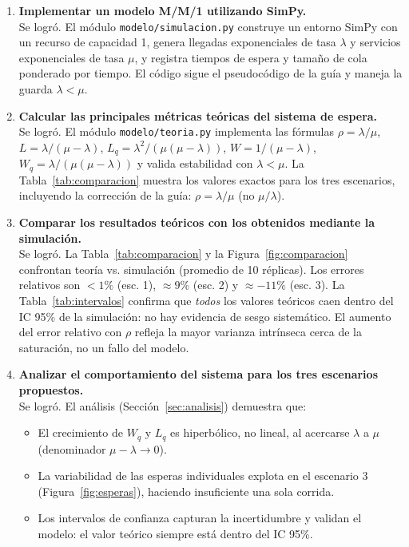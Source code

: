 \documentclass[11pt,a4paper]{article}
\begin{document}
\begin{enumerate}
    \item \textbf{Implementar un modelo M/M/1 utilizando SimPy.}
    \\
    Se logró. El módulo \texttt{modelo/simulacion.py} construye un entorno
    SimPy con un recurso de capacidad 1, genera llegadas exponenciales de tasa
    $\lambda$ y servicios exponenciales de tasa $\mu$, y registra tiempos de
    espera y tamaño de cola ponderado por tiempo. El código sigue el
    pseudocódigo de la guía y maneja la guarda $\lambda < \mu$.

    \item \textbf{Calcular las principales métricas teóricas del sistema de espera.}
    \\
    Se logró. El módulo \texttt{modelo/teoria.py} implementa las fórmulas
    $\rho=\lambda/\mu$, $L=\lambda/(\mu-\lambda)$, $L_q=\lambda^2/(\mu(\mu-\lambda))$,
    $W=1/(\mu-\lambda)$, $W_q=\lambda/(\mu(\mu-\lambda))$ y valida estabilidad con
    $\lambda < \mu$. La Tabla~\ref{tab:comparacion} muestra los valores exactos para
    los tres escenarios, incluyendo la corrección de la guía: $\rho=\lambda/\mu$
    (no $\mu/\lambda$).

    \item \textbf{Comparar los resultados teóricos con los obtenidos mediante la simulación.}
    \\
    Se logró. La Tabla~\ref{tab:comparacion} y la Figura~\ref{fig:comparacion}
    confrontan teoría vs. simulación (promedio de 10 réplicas). Los errores
    relativos son $< 1\%$ (esc. 1), $\approx 9\%$ (esc. 2) y $\approx -11\%$
    (esc. 3). La Tabla~\ref{tab:intervalos} confirma que \emph{todos} los valores
    teóricos caen dentro del IC 95\% de la simulación: no hay evidencia de
    sesgo sistemático. El aumento del error relativo con $\rho$ refleja la
    mayor varianza intrínseca cerca de la saturación, no un fallo del modelo.

    \item \textbf{Analizar el comportamiento del sistema para los tres escenarios propuestos.}
    \\
    Se logró. El análisis (Sección~\ref{sec:analisis}) demuestra que:
    \begin{itemize}
        \item El crecimiento de $W_q$ y $L_q$ es hiperbólico, no lineal, al
              acercarse $\lambda$ a $\mu$ (denominador $\mu-\lambda \to 0$).
        \item La variabilidad de las esperas individuales explota en el escenario 3
              (Figura~\ref{fig:esperas}), haciendo insuficiente una sola corrida.
        \item Los intervalos de confianza capturan la incertidumbre y validan el
              modelo: el valor teórico siempre está dentro del IC 95\%.
    \end{itemize}
\end{enumerate}
\end{document}
